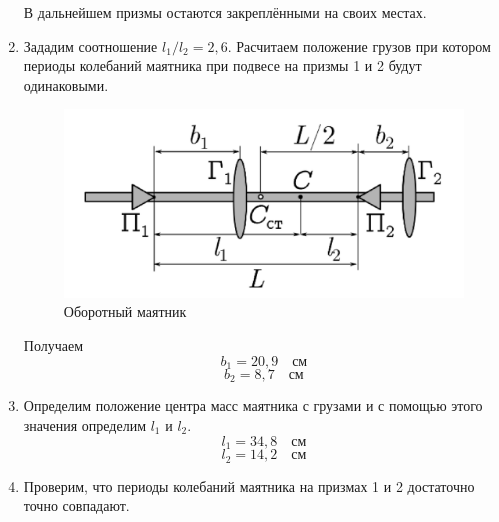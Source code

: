 \documentclass[a4paper,12 pt]{article}
\begin{document}
\begin{enumerate}
    В дальнейшем призмы остаются закреплёнными на своих местах.
    \item Зададим соотношение $l_1/l_2 = 2,6$. Расчитаем положение грузов при котором периоды колебаний маятника при подвесе на призмы 1 и 2 будут одинаковыми.
    \begin{figure}[H]
        \centering
        \includegraphics[scale = 0.3]{b}
        \caption{Оборотный маятник}
    \end{figure}
    Получаем 
    \begin{displaymath}
        b_1 = 20,9 \quad \text{см}
    \end{displaymath}
    \begin{displaymath}
        b_2 = 8,7 \quad \text{см}
    \end{displaymath}
    \item Определим положение центра масс маятника с грузами и с помощью этого значения определим $l_1$ и $l_2$.
    \begin{displaymath}
        l_1 = 34,8 \quad \text{см}
    \end{displaymath}
    \begin{displaymath}
        l_2 = 14,2 \quad \text{см}
    \end{displaymath}
    \item Проверим, что периоды колебаний маятника на призмах 1 и 2 достаточно точно совпадают.


\end{enumerate}
\end{document}

